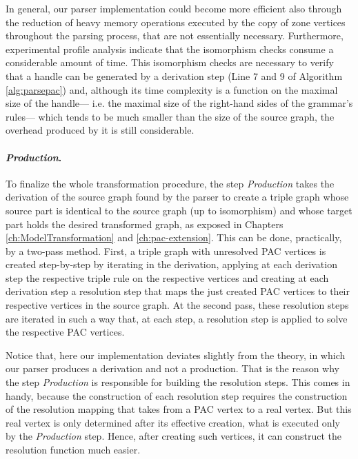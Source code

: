 In general, our parser implementation could become more efficient also through the reduction of heavy memory operations executed by the copy of zone vertices throughout the parsing process, that are not essentially necessary. Furthermore, experimental profile analysis indicate that the isomorphism checks consume a considerable amount of time. This isomorphism checks are necessary to verify that a handle can be generated by a derivation step (Line 7 and 9 of Algorithm \ref{alg:parsepac}) and, although its time complexity is a function on the maximal size of the handle--- i.e. the maximal size of the right-hand sides of the grammar's rules--- which tends to be much smaller than the size of the source graph, the overhead produced by it is still considerable. 

\paragraph*{\emph{Production}.} To finalize the whole transformation procedure, the step \emph{Production} takes the derivation of the source graph found by the parser to create a triple graph whose source part is identical to the source graph (up to isomorphism) and whose target part holds the desired transformed graph, as exposed in Chapters \ref{ch:ModelTransformation} and \ref{ch:pac-extension}. This can be done, practically, by a two-pass method. First, a triple graph with unresolved PAC vertices is created step-by-step by iterating in the derivation, applying at each derivation step the respective triple rule on the respective vertices and creating at each derivation step a resolution step that maps the just created PAC vertices to their respective vertices in the source graph. At the second pass, these resolution steps are iterated in such a way that, at each step, a resolution step is applied to solve the respective PAC vertices.

Notice that, here our implementation deviates slightly from the theory, in which our parser produces a derivation and not a production. That is the reason why the step \emph{Production} is responsible for building the resolution steps. This comes in handy, because the construction of each resolution step requires the construction of the resolution mapping that takes from a PAC vertex to a real vertex. But this real vertex is only determined after its effective creation, what is executed only by the \emph{Production} step. Hence, after creating such vertices, it can construct the resolution function much easier.

